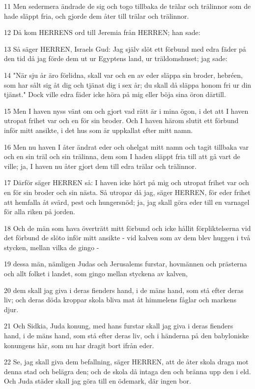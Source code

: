 \par 11 Men sedermera ändrade de sig och togo tillbaka de trälar och trälinnor som de hade släppt fria, och gjorde dem åter till trälar och trälinnor.
\par 12 Då kom HERRENS ord till Jeremia från HERREN; han sade:
\par 13 Så säger HERREN, Israels Gud: Jag själv slöt ett förbund med edra fäder på den tid då jag förde dem ut ur Egyptens land, ur träldomshuset; jag sade:
\par 14 "När sju år äro förlidna, skall var och en av eder släppa sin broder, hebréen, som har sålt sig åt dig och tjänat dig i sex år; du skall då släppa honom fri ur din tjänst." Dock ville edra fäder icke höra på mig eller böja sina öron därtill.
\par 15 Men I haven nyss vänt om och gjort vad rätt är i mina ögon, i det att I haven utropat frihet var och en för sin broder. Och I haven härom slutit ett förbund inför mitt ansikte, i det hus som är uppkallat efter mitt namn.
\par 16 Men nu haven I åter ändrat eder och ohelgat mitt namn och tagit tillbaka var och en sin träl och sin trälinna, dem som I haden släppt fria till att gå vart de ville; ja, I haven nu åter gjort dem till edra trälar och trälinnor.
\par 17 Därför säger HERREN så: I haven icke hört på mig och utropat frihet var och en för sin broder och sin nästa. Så utropar då jag, säger HERREN, för eder frihet att hemfalla åt svärd, pest och hungersnöd; ja, jag skall göra eder till en varnagel för alla riken på jorden.
\par 18 Och de män som hava överträtt mitt förbund och icke hållit förpliktelserna vid det förbund de slöto inför mitt ansikte - vid kalven som av dem blev huggen i två stycken, mellan vilka de gingo -
\par 19 dessa män, nämligen Judas och Jerusalems furstar, hovmännen och prästerna och allt folket i landet, som gingo mellan styckena av kalven,
\par 20 dem skall jag giva i deras fienders hand, i de mäns hand, som stå efter deras liv; och deras döda kroppar skola bliva mat åt himmelens fåglar och markens djur.
\par 21 Och Sidkia, Juda konung, med hans furstar skall jag giva i deras fienders hand, i de mäns hand, som stå efter deras liv, och i händerna på den babyloniske konungens här, som nu har dragit bort ifrån eder.
\par 22 Se, jag skall giva dem befallning, säger HERREN, att de åter skola draga mot denna stad och belägra den; och de skola då intaga den och bränna upp den i eld. Och Juda städer skall jag göra till en ödemark, där ingen bor.

